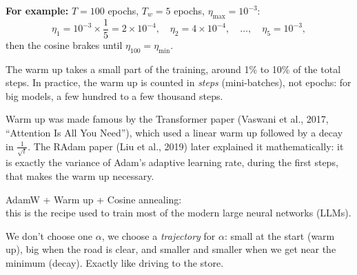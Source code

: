 \begin{center}
\end{center}

\noindent\textbf{For example:} $T=100$ epochs, $T_w=5$ epochs, $\eta_{\max}=10^{-3}$:
\[
\eta_1=10^{-3}\times\frac15=2\times10^{-4},\quad
\eta_2=4\times10^{-4},\quad\dots,\quad
\eta_5=10^{-3},
\]
then the cosine brakes until $\eta_{100}=\eta_{\min}$.

 The warm up takes a small part of the training, around 1\% to 10\% of the total steps. In practice, the warm up is counted in \emph{steps} (mini-batches), not epochs: for big models, a few hundred to a few thousand steps.

\Rem Warm up was made famous by the Transformer paper (Vaswani et al., 2017, ``Attention Is All You Need''), which used a linear warm up followed by a decay in $\frac{1}{\sqrt t}$. The RAdam paper (Liu et al., 2019) later explained it mathematically: it is exactly the variance of Adam's adaptive learning rate, during the first steps, that makes the warm up necessary.

\begin{goldbox}
AdamW + Warm up + Cosine annealing:\\ this is the recipe used to train most of the modern large neural networks (LLMs).
\end{goldbox}


We don't choose one $\alpha$, we choose a \emph{trajectory} for $\alpha$: small at the start (warm up), big when the road is clear, and smaller and smaller when we get near the minimum (decay). Exactly like driving to the store.
